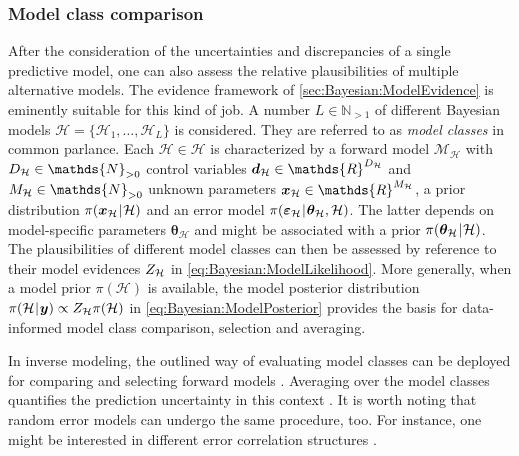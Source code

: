 \subsubsection{Model class comparison}
After the consideration of the uncertainties and discrepancies of a single predictive model, one can also assess the relative plausibilities of multiple alternative models.
The evidence framework of \cref{sec:Bayesian:ModelEvidence} is eminently suitable for this kind of job.
A number \(L \in \mathds{N}_{>1} \) of different Bayesian models \(\bm{\mathcal{H}} = \{\mathcal{H}_1,\ldots,\mathcal{H}_L\}\) is considered.
They are referred to as \emph{model classes} in common parlance.
Each \(\mathcal{H} \in \bm{\mathcal{H}}\) is characterized by a forward model \(\mathcal{M}_{\mathcal{H}}\)
with \(\dimControl_{\mathcal{H}} \in \mathds{N}_{>0}\) control variables \(\bm{d}_{\mathcal{H}} \in \mathds{R}^{\dimControl_{\mathcal{H}}}\)
and \(\dimParam_{\mathcal{H}} \in \mathds{N}_{>0}\) unknown parameters \(\bm{x}_{\mathcal{H}} \in \mathds{R}^{\dimParam_{\mathcal{H}}}\),
a prior distribution \(\pi(\bm{x}_{\mathcal{H}} {\:\!}|{\:\!} \mathcal{H})\) and an error model \(\pi(\bm{\varepsilon}_{\mathcal{H}} {\:\!}|{\:\!} \bm{\theta}_{\mathcal{H}},\mathcal{H})\).
The latter depends on model-specific parameters \(\bm{\theta}_{\mathcal{H}}\) and might be associated with a prior \(\pi(\bm{\theta}_{\mathcal{H}} {\:\!}|{\:\!} \mathcal{H})\).
The plausibilities of different model classes can then be assessed by reference to their model evidences \(Z_{\mathcal{H}}\) in \cref{eq:Bayesian:ModelLikelihood}.
More generally, when a model prior \(\pi(\mathcal{H})\) is available, the model posterior distribution \(\pi(\mathcal{H} {\:\!}|{\:\!} \bm{y}) \propto Z_{\mathcal{H}} \pi(\mathcal{H})\)
in \cref{eq:Bayesian:ModelPosterior} provides the basis for data-informed model class comparison, selection and averaging.
\par %
In inverse modeling, the outlined way of evaluating model classes can be deployed for comparing and selecting forward models \cite{Bayesian:Mthembu2011,Bayesian:Riley2011,Bayesian:Riley2014}.
Averaging over the model classes quantifies the prediction uncertainty in this context \cite{Bayesian:Park2010,Bayesian:Park2011}.
It is worth noting that random error models can undergo the same procedure, too.
For instance, one might be interested in different error correlation structures \cite{Bayesian:Simoen2013:a}.